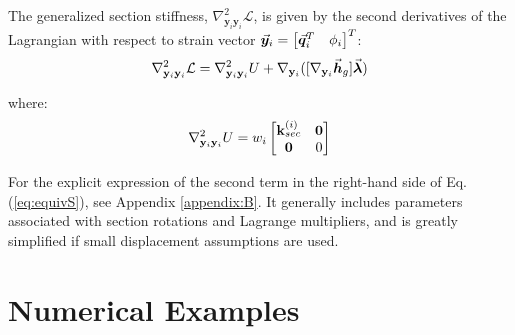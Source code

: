 The generalized section stiffness,
$\nabla^2_{\mathbf{y}_i\mathbf{y}_i}\mathcal{L}$, is given by the second
derivatives of the Lagrangian with respect to strain vector
$\vec{\bm{y}}_i=\begin{bmatrix}
	\vec{\bm{q}}_i^T & \phi_i
\end{bmatrix}^T$:  %
\begin{gather}
	\nabla^2_{\mathbf{y}_i\mathbf{y}_i}\mathcal{L} =
	\nabla^2_{\mathbf{y}_i\mathbf{y}_i}U
	+ \nabla_{\mathbf{y}_i}([\nabla_{\mathbf{y}_i}\vec{\bm{h}}_g]\vec{\bm{\lambda}})
	\label{eq:equivS}
\end{gather}

\noindent where:
\begin{gather}
	\nabla^2_{\mathbf{y}_i\mathbf{y}_i}U = w_i\begin{bmatrix}
		\mathbf{k}_{sec}^{(i)} & \mathbf{0}\\
		\mathbf{0} & 0
	\end{bmatrix}\nonumber
\end{gather}

\noindent For the explicit expression of the second term in the right-hand side
of Eq. (\ref{eq:equivS}), see Appendix \ref{appendix:B}. It
generally includes parameters associated with section rotations and Lagrange
multipliers, and is greatly simplified if small displacement assumptions
are used.



\section{Numerical Examples}\label{section:CH2-S5}

